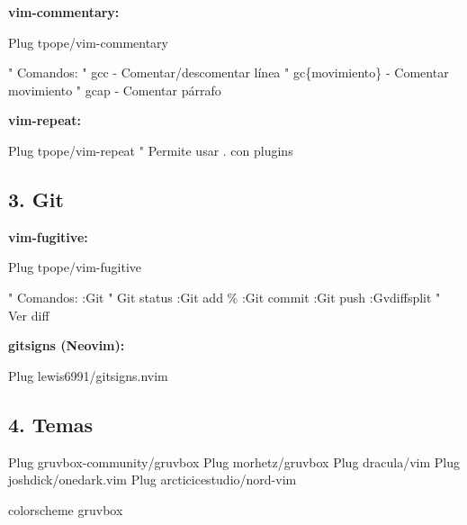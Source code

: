 \documentclass[
  doc,
  floatsintext,
  longtable,
  a4paper,
  nolmodern,
  notxfonts,
  notimes,
  12pt,
  colorlinks=true,linkcolor=blue,citecolor=blue,urlcolor=blue]{apa7}
\newenvironment{Shaded}{\begin{snugshade}}{\end{snugshade}}
\newcommand{\NormalTok}[1]{\textcolor[rgb]{0.00,0.23,0.31}{#1}}
\begin{document}
\textbf{vim-commentary:}

\begin{Shaded}
\begin{Highlighting}[]
\NormalTok{Plug \textquotesingle{}tpope/vim{-}commentary\textquotesingle{}}

\NormalTok{" Comandos:}
\NormalTok{" gcc {-} Comentar/descomentar línea}
\NormalTok{" gc\{movimiento\} {-} Comentar movimiento}
\NormalTok{" gcap {-} Comentar párrafo}
\end{Highlighting}
\end{Shaded}

\textbf{vim-repeat:}

\begin{Shaded}
\begin{Highlighting}[]
\NormalTok{Plug \textquotesingle{}tpope/vim{-}repeat\textquotesingle{}}
\NormalTok{" Permite usar . con plugins}
\end{Highlighting}
\end{Shaded}

\subsection{3. Git}\label{git}

\textbf{vim-fugitive:}

\begin{Shaded}
\begin{Highlighting}[]
\NormalTok{Plug \textquotesingle{}tpope/vim{-}fugitive\textquotesingle{}}

\NormalTok{" Comandos:}
\NormalTok{:Git       " Git status}
\NormalTok{:Git add \%}
\NormalTok{:Git commit}
\NormalTok{:Git push}
\NormalTok{:Gvdiffsplit  " Ver diff}
\end{Highlighting}
\end{Shaded}

\textbf{gitsigns (Neovim):}

\begin{Shaded}
\begin{Highlighting}[]
\NormalTok{Plug \textquotesingle{}lewis6991/gitsigns.nvim\textquotesingle{}}
\end{Highlighting}
\end{Shaded}

\subsection{4. Temas}\label{temas}

\begin{Shaded}
\begin{Highlighting}[]
\NormalTok{Plug \textquotesingle{}gruvbox{-}community/gruvbox\textquotesingle{}}
\NormalTok{Plug \textquotesingle{}morhetz/gruvbox\textquotesingle{}}
\NormalTok{Plug \textquotesingle{}dracula/vim\textquotesingle{}}
\NormalTok{Plug \textquotesingle{}joshdick/onedark.vim\textquotesingle{}}
\NormalTok{Plug \textquotesingle{}arcticicestudio/nord{-}vim\textquotesingle{}}

\NormalTok{colorscheme gruvbox}
\end{Highlighting}
\end{Shaded}
\end{document}
